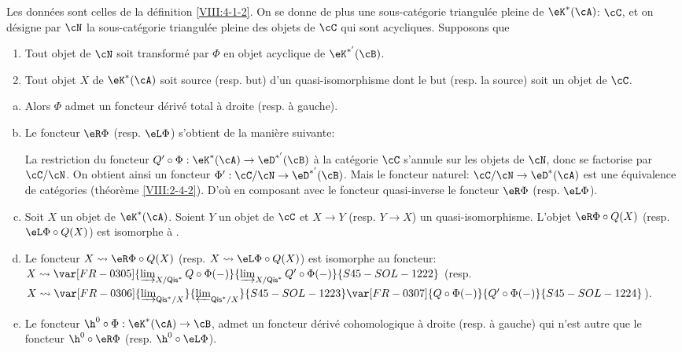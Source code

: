 \begin{theorem}\label{VIII:4-2-3} %
Les données sont celles de la définition \ref{VIII:4-1-2}. On se donne de 
plus une sous-catégorie triangulée pleine de $\eK^\ast(\cA)$: $\cC$, et on 
désigne par $\cN$ la sous-catégorie triangulée pleine des objets de $\cC$ 
qui sont acycliques. Supposons que 
\begin{enumerate}[(1)]
  \item Tout objet de $\cN$ soit transformé par $\Phi$ en objet acyclique 
    de $\eK^{\ast'}(\cB)$. 
  \item Tout objet $X$ de $\eK^\ast(\cA)$ soit source (resp. but) d'un 
    quasi-isomorphisme dont le but (resp. la source) soit un objet de $\cC$. 
\end{enumerate}
\begin{enumerate}[a)]
  \item Alors $\Phi$ admet un foncteur dérivé total à droite (resp. 
    à gauche). 
  \item {}Le foncteur $\eR \Phi$ (resp. $\eL \Phi$) s'obtient de la manière 
    suivante: 
    
    La restriction du foncteur 
    $Q'\circ \Phi:\eK^\ast(\cA) \to \eD^{\ast'}(\cB)$ à la catégorie $\cC$ 
    s'annule sur les objets de $\cN$, donc se factorise par $\cC/\cN$. On 
    obtient ainsi un foncteur $\Phi':\cC/\cN\to \eD^{\ast'}(\cB)$. Mais le 
    foncteur naturel: $\cC/\cN\to \eD^\ast(\cA)$ est une équivalence de 
    catégories (théorème \ref{VIII:2-4-2}). D'où en composant avec le 
    foncteur quasi-inverse le foncteur $\eR\Phi$ (resp. $\eL \Phi$). 
  \item Soit $X$ un objet de $\eK^\ast(\cA)$. Soient $Y$ un objet de $\cC$ et 
    $X\to Y$ (resp. $Y\to X$) un quasi-isomorphisme. L'objet 
    $\eR\Phi\circ Q(X)$ (resp. $\eL \Phi\circ Q(X)$) est isomorphe à 
    . 
  \item Le foncteur $X\leadsto \eR\Phi\circ Q(X)$ (resp. 
    $X\leadsto \eL \Phi\circ Q(X)$) est isomorphe au foncteur: 
    $X\leadsto \var[FR-0305]{\varinjlim_{X/\mathsf{Qis}^\ast} Q\circ\Phi(-)}{\varinjlim_{X/\mathsf{Qis}^\ast} Q'\circ\Phi(-)}{S45-SOL-1222}$ (resp. 
    $X\leadsto \var[FR-0306]{\varinjlim_{\mathsf{Qis}^\ast/X}}{\varprojlim_{\mathsf{Qis}^\ast/X}}{S45-SOL-1223} \var[FR-0307]{Q\circ \Phi(-)}{Q'\circ \Phi(-)}{S45-SOL-1224}$). 
  \item Le foncteur $\h^0{}\circ \Phi:\eK^\ast(\cA)\to \cB$, admet un 
    foncteur dérivé cohomologique à droite (resp. à gauche) qui n'est 
    autre que le foncteur $\h^0{}\circ\eR\Phi$ (resp. $\h^0{}\circ \eL\Phi$). 
\end{enumerate}
\end{theorem}





